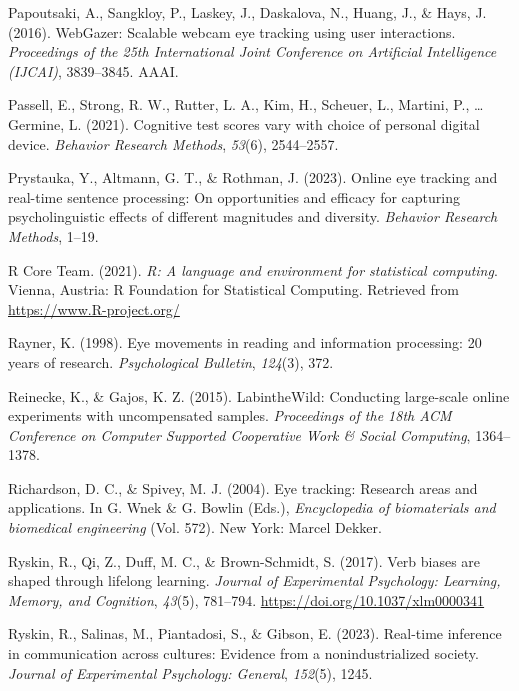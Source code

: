\documentclass[
  man,floatsintext]{apa6}
\newlength{\cslhangindent}
\newenvironment{CSLReferences}[2] %
 {\begin{list}{}{%
  \setlength{\itemindent}{0pt}
  \setlength{\leftmargin}{0pt}
  \setlength{\parsep}{0pt}
  \ifodd #1
   \setlength{\leftmargin}{\cslhangindent}
   \setlength{\itemindent}{-1\cslhangindent}
  \fi
  \setlength{\itemsep}{#2\baselineskip}}}
 {\end{list}}
\begin{document}
\begin{CSLReferences}{1}{0}
Papoutsaki, A., Sangkloy, P., Laskey, J., Daskalova, N., Huang, J., \& Hays, J. (2016). {WebGazer}: {Scalable} webcam eye tracking using user interactions. \emph{Proceedings of the 25th International Joint Conference on Artificial Intelligence ({IJCAI})}, 3839--3845. {AAAI}.

Passell, E., Strong, R. W., Rutter, L. A., Kim, H., Scheuer, L., Martini, P., \ldots{} Germine, L. (2021). Cognitive test scores vary with choice of personal digital device. \emph{Behavior Research Methods}, \emph{53}(6), 2544--2557.

Prystauka, Y., Altmann, G. T., \& Rothman, J. (2023). Online eye tracking and real-time sentence processing: On opportunities and efficacy for capturing psycholinguistic effects of different magnitudes and diversity. \emph{Behavior Research Methods}, 1--19.

R Core Team. (2021). \emph{R: A language and environment for statistical computing}. Vienna, Austria: R Foundation for Statistical Computing. Retrieved from \url{https://www.R-project.org/}

Rayner, K. (1998). Eye movements in reading and information processing: 20 years of research. \emph{Psychological Bulletin}, \emph{124}(3), 372.

Reinecke, K., \& Gajos, K. Z. (2015). LabintheWild: Conducting large-scale online experiments with uncompensated samples. \emph{Proceedings of the 18th ACM Conference on Computer Supported Cooperative Work \& Social Computing}, 1364--1378.

Richardson, D. C., \& Spivey, M. J. (2004). Eye tracking: {Research} areas and applications. In G. Wnek \& G. Bowlin (Eds.), \emph{Encyclopedia of biomaterials and biomedical engineering} (Vol. 572). New York: Marcel Dekker.

Ryskin, R., Qi, Z., Duff, M. C., \& Brown-Schmidt, S. (2017). Verb biases are shaped through lifelong learning. \emph{Journal of Experimental Psychology: Learning, Memory, and Cognition}, \emph{43}(5), 781--794. \url{https://doi.org/10.1037/xlm0000341}

Ryskin, R., Salinas, M., Piantadosi, S., \& Gibson, E. (2023). Real-time inference in communication across cultures: Evidence from a nonindustrialized society. \emph{Journal of Experimental Psychology: General}, \emph{152}(5), 1245.


\end{CSLReferences}
\end{document}
